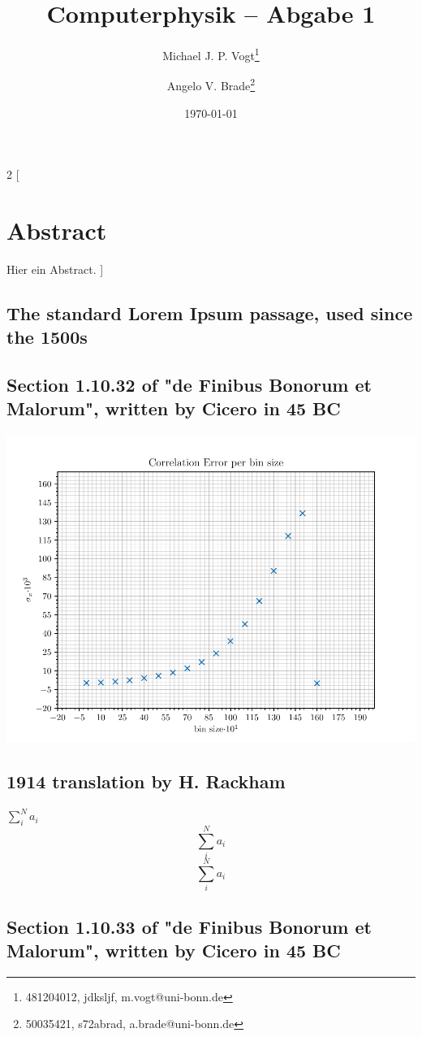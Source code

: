 \documentclass[10pt]{article}
\title{Computerphysik -- Abgabe 1}
\author[1]{Michael J. P. Vogt\thanks{481204012, jdksljf, m.vogt@uni-bonn.de}}
\author[1]{Angelo V. Brade\thanks{50035421, s72abrad, a.brade@uni-bonn.de}}
\affil[1]{Rhenish Friedrich Wilhelm University of Bonn}
\date{\today}
\newenvironment{Figure}
  {\par\medskip\noindent\minipage{\linewidth}}
  {\endminipage\par\medskip}
\begin{document}
\maketitle
\newpage

\tableofcontents
\newpage


\pagestyle{fancy}
\fancyhead[R]{\thepage}
\fancyhead[L]{\leftmark}

\begin{multicols}{2}
[
    \section{Abstract}
    Hier ein Abstract.
]
\subsection{The standard Lorem Ipsum passage, used since the 1500s}
\lipsum[1]

\lipsum[6]

\subsection{Section 1.10.32 of "de Finibus Bonorum et Malorum", written by Cicero in 45 BC}
\lipsum[2]
\begin{Figure}
    \centering
    \includegraphics[width=1.0\linewidth]{CorrelationErrorPerBinSize}
\end{Figure}
\lipsum[3]

\subsection{1914 translation by H. Rackham}
\lipsum[4]
\(\sum_{i}^{N}a_i\)
\[\sum_{i}^{N}a_i\]
\begin{equation}
\sum_{i}^{N}a_i
\end{equation}

\subsection{Section 1.10.33 of "de Finibus Bonorum et Malorum", written by Cicero in 45 BC}
\lipsum[5]


\end{multicols}
\end{document}
